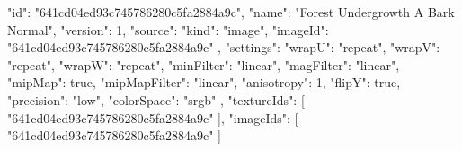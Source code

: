 {
  "id": "641cd04ed93c745786280c5fa2884a9c",
  "name": "Forest Undergrowth A Bark Normal",
  "version": 1,
  "source": {
    "kind": "image",
    "imageId": "641cd04ed93c745786280c5fa2884a9c"
  },
  "settings": {
    "wrapU": "repeat",
    "wrapV": "repeat",
    "wrapW": "repeat",
    "minFilter": "linear",
    "magFilter": "linear",
    "mipMap": true,
    "mipMapFilter": "linear",
    "anisotropy": 1,
    "flipY": true,
    "precision": "low",
    "colorSpace": "srgb"
  },
  "textureIds": [
    "641cd04ed93c745786280c5fa2884a9c"
  ],
  "imageIds": [
    "641cd04ed93c745786280c5fa2884a9c"
  ]
}
